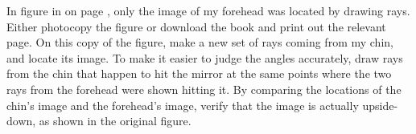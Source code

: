 In figure  in on page \pageref{fig:real-and-virtual}, only the image of my
forehead was located by drawing rays. Either photocopy the
figure or download the book and print out the relevant page.
On this copy of the figure, make a new set of rays coming from my chin,
and locate its image. To make it easier to judge the angles
accurately, draw rays from the chin that happen to hit the
mirror at the same points where the two rays from the
forehead were shown hitting it. By comparing the locations
of the chin's image and the forehead's image, verify that
the image is actually upside-down, as shown in the original figure.
